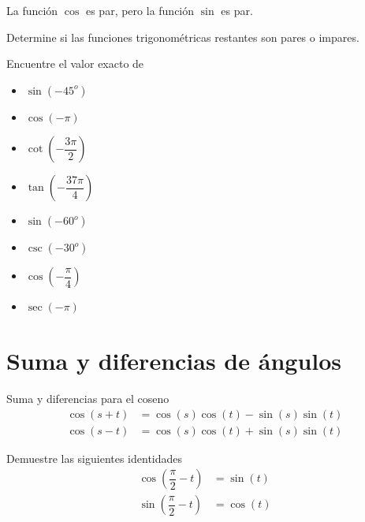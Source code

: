 	\begin{proposicion}
		La función $\cos$ es par, pero la función $\sin$ es par. 
	\end{proposicion}
	

{}
	\begin{problema}
		Determine si las funciones trigonométricas restantes son pares o impares.
	\end{problema}
	

{}
	\begin{problema}
		\label{exmp:0607}
		Encuentre el valor exacto de 
		\begin{itemize}
			\item $\sin(-45^{o})$ 
			\item $\cos(-\pi)$ 
			\item $\cot\left( -\dfrac{3\pi}{2} \right)$ 
			\item $\tan\left( -\dfrac{37\pi}{4} \right)$
		\end{itemize}
		
	\end{problema}
	

{}
	\begin{problema}
		\begin{itemize}
			\item $\sin(-60^{o})$
			\item $\csc(-30^{o})$
			\item $\cos\left( -\dfrac{\pi}{4} \right)$
			\item $\sec(-\pi)$
		\end{itemize}
		
	\end{problema}


\section{Suma y diferencias de ángulos}

{Suma y diferencias para el coseno}
	\begin{align*}
		\cos(s+t) &= \cos(s)\cos(t)-\sin(s)\sin(t) \\  
		\cos(s-t) &= \cos(s)\cos(t)+\sin(s)\sin(t)
	\end{align*}



	\begin{problema} Demuestre las siguientes identidades
		\begin{align*}
			\cos\left(\dfrac{\pi}{2}-t\right) &= \sin(t) \\
			\sin\left(\dfrac{\pi}{2}-t\right) &= \cos(t) 
		\end{align*}
	\end{problema}


